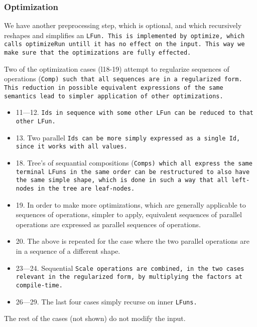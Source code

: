 \subsubsection{Optimization}
We have another preprocessing step, which is optional, and which recursively reshapes and simplifies an \tt{LFun}.
This is implemented by \tt{optimize}, which calls \tt{optimizeRun} untill it has no effect on the input. This way we make sure that the optimizations are fully effected.

Two of the optimization cases (l18-19) attempt to regularize sequences of operations (\tt{Comp}) such that all sequences are in a regularized form. This reduction in possible equivalent expressions of the same semantics lead to simpler application of other optimizations.

\begin{itemize}
	\item 11---12. \tt{Id}s in sequence with some other \tt{LFun} can be reduced to that other \tt{LFun}.
	\item 13. Two parallel \tt{Id}s can be more simply expressed as a single \tt{Id}, since it works with all values.
	\item 18. Tree's of sequantial compositions (\tt{Comp}s) which all express the same terminal \tt{LFun}s in the same order can be restructured to also have the same simple shape, which is done in such a way that all left-nodes in the tree are leaf-nodes.
	\item 19. In order to make more optimizations, which are generally applicable to sequences of operations, simpler to apply, equivalent sequences of parallel operations are expressed as parallel sequences of operations.
	\item 20. The above is repeated for the case where the two parallel operations are in a sequence of a different shape.
	\item 23---24. Sequential \tt{Scale} operations are combined, in the two cases relevant in the regularized form, by multiplying the factors at compile-time.
	\item 26---29. The last four cases simply recurse on inner \tt{LFuns}.
\end{itemize}

The rest of the cases (not shown) do not modify the input.

